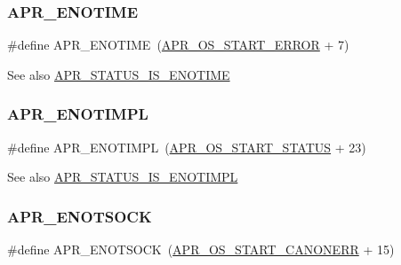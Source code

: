 \subsubsection{\texorpdfstring{A\+P\+R\+\_\+\+E\+N\+O\+T\+I\+ME}{APR\_ENOTIME}}
{\footnotesize\ttfamily \#define A\+P\+R\+\_\+\+E\+N\+O\+T\+I\+ME~(\mbox{\hyperlink{group__apr__errno_ga191894048b7bd0cca3cf0bdff1eb695b}{A\+P\+R\+\_\+\+O\+S\+\_\+\+S\+T\+A\+R\+T\+\_\+\+E\+R\+R\+OR}} + 7)}

\begin{DoxySeeAlso}{See also}
\mbox{\hyperlink{group___a_p_r___s_t_a_t_u_s___i_s_ga65cb54d0b5902784037626841e26e709}{A\+P\+R\+\_\+\+S\+T\+A\+T\+U\+S\+\_\+\+I\+S\+\_\+\+E\+N\+O\+T\+I\+ME}} 
\end{DoxySeeAlso}
\mbox{\label{group___a_p_r___error_ga939ddb834a30bc9a5a0a329b13000161}} 
\subsubsection{\texorpdfstring{A\+P\+R\+\_\+\+E\+N\+O\+T\+I\+M\+PL}{APR\_ENOTIMPL}}
{\footnotesize\ttfamily \#define A\+P\+R\+\_\+\+E\+N\+O\+T\+I\+M\+PL~(\mbox{\hyperlink{group__apr__errno_ga450e1a5734732e092ddaa5b67414f69b}{A\+P\+R\+\_\+\+O\+S\+\_\+\+S\+T\+A\+R\+T\+\_\+\+S\+T\+A\+T\+US}} + 23)}

\begin{DoxySeeAlso}{See also}
\mbox{\hyperlink{group___a_p_r___s_t_a_t_u_s___i_s_gacab882e24f5d6491777e8ef7763d02fb}{A\+P\+R\+\_\+\+S\+T\+A\+T\+U\+S\+\_\+\+I\+S\+\_\+\+E\+N\+O\+T\+I\+M\+PL}} 
\end{DoxySeeAlso}
\mbox{\label{group___a_p_r___error_gad456312527050c661dc19a8f17a0f0ef}} 
\subsubsection{\texorpdfstring{A\+P\+R\+\_\+\+E\+N\+O\+T\+S\+O\+CK}{APR\_ENOTSOCK}}
{\footnotesize\ttfamily \#define A\+P\+R\+\_\+\+E\+N\+O\+T\+S\+O\+CK~(\mbox{\hyperlink{group__apr__errno_ga7bca957c11b80b31cb54b0d2cbe9e025}{A\+P\+R\+\_\+\+O\+S\+\_\+\+S\+T\+A\+R\+T\+\_\+\+C\+A\+N\+O\+N\+E\+RR}} + 15)}

